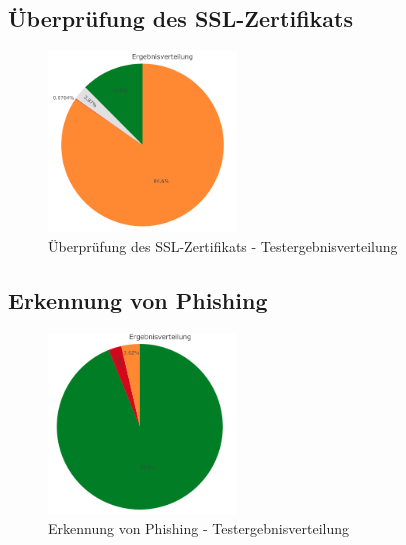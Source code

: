 \subsection{Überprüfung des SSL-Zertifikats}
\begin{figure}[H]
  \centering
  \includegraphics[width=5cm]{images/stats/diacertificate}
  \caption{Überprüfung des SSL-Zertifikats - Testergebnisverteilung}
  \label{fig:diacertificate}
\end{figure}

\subsection{Erkennung von Phishing}
\begin{figure}[H]
  \centering
  \includegraphics[width=5cm]{images/stats/diaphishing}
  \caption{Erkennung von Phishing - Testergebnisverteilung}
  \label{fig:diaphishing}
\end{figure}
